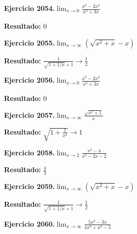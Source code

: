 \documentclass[10pt,a4paper]{article}
\begin{document}
\newpage
\begin{ejbox}
\textbf{Ejercicio 2054.}\quad $\lim_{x\to 0} \frac{x^3-2x^2}{x^2+3x}$
\end{ejbox}

\begin{solbox}
\textbf{Resultado:} \(\displaystyle 0\)
\end{solbox}

\begin{ejbox}
\textbf{Ejercicio 2055.}\quad $\lim_{x\to \infty} (\sqrt{x^2+x} - x)$
\end{ejbox}

\begin{solbox}
\textbf{Resultado:} \(\displaystyle \frac{1}{\sqrt{1+1/x}+1} \to \frac{1}{2}\)
\end{solbox}

\begin{ejbox}
\textbf{Ejercicio 2056.}\quad $\lim_{x\to 0} \frac{x^3-2x^2}{x^2+3x}$
\end{ejbox}

\begin{solbox}
\textbf{Resultado:} \(\displaystyle 0\)
\end{solbox}

\newpage
\begin{ejbox}
\textbf{Ejercicio 2057.}\quad $\lim_{x\to \infty} \frac{\sqrt{x^2+1}}{x}$
\end{ejbox}

\begin{solbox}
\textbf{Resultado:} \(\displaystyle \sqrt{1+\frac{1}{x^2}} \to 1\)
\end{solbox}

\begin{ejbox}
\textbf{Ejercicio 2058.}\quad $\lim_{x\to 2} \frac{x^2-4}{x^2-2x-2}$
\end{ejbox}

\begin{solbox}
\textbf{Resultado:} \(\displaystyle \frac{4}{3}\)
\end{solbox}

\begin{ejbox}
\textbf{Ejercicio 2059.}\quad $\lim_{x\to \infty} (\sqrt{x^2+x} - x)$
\end{ejbox}

\begin{solbox}
\textbf{Resultado:} \(\displaystyle \frac{1}{\sqrt{1+1/x}+1} \to \frac{1}{2}\)
\end{solbox}

\newpage
\begin{ejbox}
\textbf{Ejercicio 2060.}\quad $\lim_{x\to \infty} \frac{5x^3 - 3x}{4x^3 + x^2 - 5}$
\end{ejbox}
\end{document}
